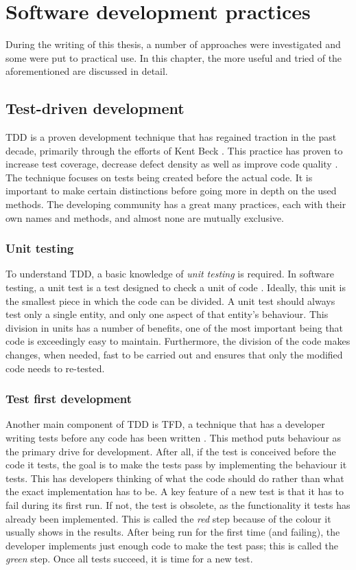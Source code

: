 \documentclass[11pt,british]{article}
\begin{document}
\newpage{}
\section{Software development practices}
During the writing of this thesis, a number of approaches were investigated and some were put to practical use. In this chapter, the more useful and tried of the aforementioned are discussed in detail.


\subsection{Test-driven development}
\label{subsec:TDD}
\gls{TDD} is a proven development technique that has regained traction in the past decade, primarily through the efforts of Kent Beck \cite{VHDLUnit,agiletdd}. This practice has proven to increase test coverage, decrease defect density as well as improve code quality \cite{TDDinpractice,Siniaalto,BhatN06}. The technique focuses on tests being created before the actual code. It is important to make certain distinctions before going more in depth on the used methods. The developing community has a great many practices, each with their own names and methods, and almost none are mutually exclusive.

\subsubsection{Unit testing}
To understand \gls{TDD}, a basic knowledge of \emph{unit testing} is required. In software testing, a unit test is a test designed to check a unit of code \cite{extremeunit,VHDLUnit}. Ideally, this unit is the smallest piece in which the code can be divided. A unit test should always test only a single entity, and only one aspect of that entity's behaviour. This division in units has a number of benefits, one of the most important being that code is exceedingly easy to maintain. Furthermore, the division of the code makes changes, when needed, fast to be carried out and ensures that only the modified code needs to re-tested.

\subsubsection{Test first development}
Another main component of \gls{TDD} is \gls{TFD}, a technique that has a developer writing tests before any code has been written \cite{extremeunit}. This method puts behaviour as the primary drive for development. After all, if the test is conceived before the code it tests, the goal is to make the tests pass by implementing the behaviour it tests. This has developers thinking of what the code should do rather than what the exact implementation has to be. A key feature of a new test is that it has to fail during its first run. If not, the test is obsolete, as the functionality it tests has already been implemented. This is called the \emph{red} step because of the colour it usually shows in the results. After being run for the first time (and failing), the developer implements just enough code to make the test pass; this is called the \emph{green} step. Once all tests succeed, it is time for a new test.
\end{document}
